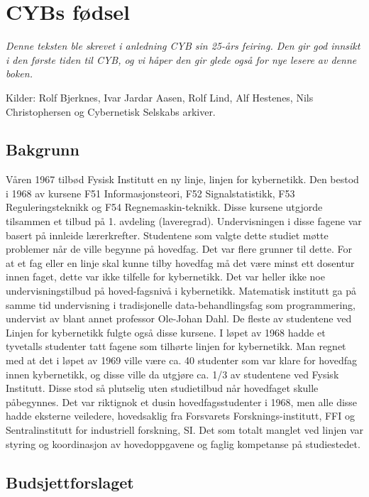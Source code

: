 \chapter{CYBs fødsel}

\emph{Denne teksten ble skrevet i anledning CYB sin 25-års feiring. Den gir god innsikt i den første tiden til CYB, og vi håper den gir glede også for nye lesere av denne boken.}

\author{Av Jon E. Dahlen}

Kilder: Rolf Bjerknes, Ivar Jardar Aasen, Rolf Lind, Alf Hestenes, Nils Christophersen og Cybernetisk Selskabs arkiver.

\section{Bakgrunn}

Våren 1967 tilbød Fysisk Institutt en ny linje, linjen for kybernetikk. Den bestod i 1968 av kursene F51 Informasjonsteori, F52 Signalstatistikk, F53 Reguleringsteknikk og F54 Regnemaskin-teknikk. Disse kursene utgjorde tilsammen et tilbud på 1. avdeling (laveregrad). Undervisningen i disse fagene var basert på innleide lærerkrefter. Studentene som valgte dette studiet møtte problemer når de ville begynne på hovedfag. Det var flere grunner til dette. For at et fag eller en linje skal kunne tilby hovedfag må det være minst ett dosentur innen faget, dette var ikke tilfelle for kybernetikk. Det var heller ikke noe undervisningstilbud på hoved-fagsnivå i kybernetikk. Matematisk institutt ga på samme tid undervisning i tradisjonelle data-behandlingsfag som programmering, undervist av blant annet professor Ole-Johan Dahl. De fleste av studentene ved Linjen for kybernetikk fulgte også disse kursene. I løpet av 1968 hadde et tyvetalls studenter tatt fagene som tilhørte linjen for kybernetikk. Man regnet med at det i løpet av 1969 ville være ca. 40 studenter som var klare for hovedfag innen kybernetikk, og disse ville da utgjøre ca. 1/3 av studentene ved Fysisk Institutt. Disse stod så plutselig uten studietilbud når hovedfaget skulle påbegynnes. Det var riktignok et dusin hovedfagsstudenter i 1968, men alle disse hadde eksterne veiledere, hovedsaklig fra Forsvarets Forsknings-institutt, FFI og Sentralinstitutt for industriell forskning, SI. Det som totalt manglet ved linjen var styring og koordinasjon av hovedoppgavene og faglig kompetanse på studiestedet.

\section{Budsjettforslaget}

